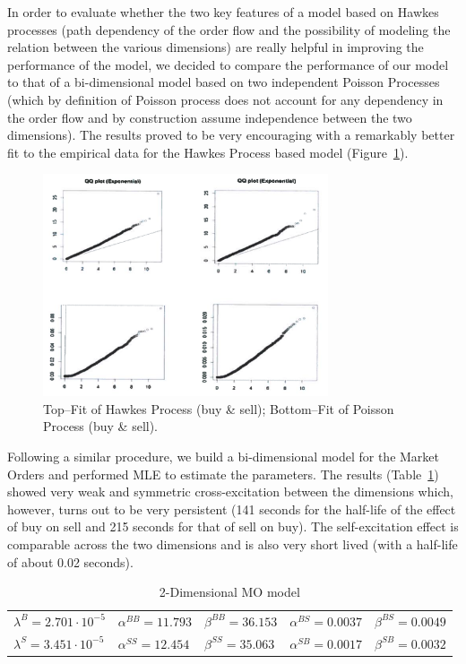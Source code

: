 In order to evaluate whether the two key features of a model based on Hawkes processes (path dependency of the order flow and the possibility of modeling the relation between the various dimensions) are really helpful in improving the performance of the model, we decided to compare the performance of our model to that of a bi-dimensional model based on two independent Poisson Processes (which by definition of Poisson process does not account for any dependency in the order flow and by construction assume independence between the two dimensions). The results proved to be very encouraging with a remarkably better fit to the empirical data for the Hawkes Process based model (Figure~\ref{fig:4hawkes6}).
	\begin{figure}[!ht]
   	\centering
   	\includegraphics[width=0.75\textwidth]{chapters/chapter_trade_data_models/figures/4hawkes6.png} 
   	\caption{Top--Fit of Hawkes Process (buy \& sell); Bottom--Fit of Poisson Process (buy \& sell). \label{fig:4hawkes6}}
	\end{figure}


Following a similar procedure, we build a bi-dimensional model for the Market Orders and performed MLE to estimate the parameters. The results (Table~\ref{tab:2dimmomod}) showed very weak and symmetric cross-excitation between the dimensions which, however, turns out to be very persistent (141 seconds for the half-life of the effect of buy on sell and 215 seconds for that of sell on buy). The self-excitation effect is comparable across the two dimensions and is also very short lived (with a half-life of about 0.02 seconds).
	\begin{table}
	\centering
	\caption{2-Dimensional MO model \label{tab:2dimmomod}}
	\begin{tabular}{lllll}  
	$\lambda^B=2.701 \cdot 10^{-5}$ & $\alpha^{BB}=11.793$ & $\beta^{BB}=36.153$ & $\alpha^{BS}=0.0037$ & $\beta^{BS}=0.0049$ \\
	$\lambda^S=3.451 \cdot 10^{-5}$ & $\alpha^{SS}=12.454$ & $\beta^{SS}=35.063$ & $\alpha^{SB}=0.0017$ & $\beta^{SB}=0.0032$
	\end{tabular}
	\end{table}
	

